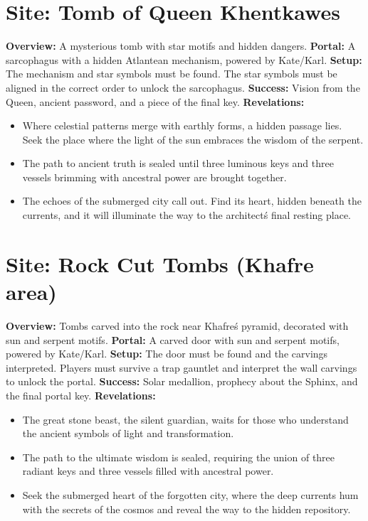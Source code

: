 \documentclass[12pt]{article}
\begin{document}
\hrulefill

\section*{Site: Tomb of Queen Khentkawes}
\textbf{Overview:}
A mysterious tomb with star motifs and hidden dangers.
\textbf{Portal:}
A sarcophagus with a hidden Atlantean mechanism, powered by Kate/Karl.
\textbf{Setup:}
The mechanism and star symbols must be found. The star symbols must be aligned in the correct order to unlock the sarcophagus.
\textbf{Success:}
Vision from the Queen, ancient password, and a piece of the final key.
\textbf{Revelations:}
\begin{itemize}
  \item Where celestial patterns merge with earthly forms, a hidden passage lies. Seek the place where the light of the sun embraces the wisdom of the serpent.
  \item The path to ancient truth is sealed until three luminous keys and three vessels brimming with ancestral power are brought together.
  \item The echoes of the submerged city call out. Find its heart, hidden beneath the currents, and it will illuminate the way to the architect\'s final resting place.
\end{itemize}

\hrulefill

\section*{Site: Rock Cut Tombs (Khafre area)}
\textbf{Overview:}
Tombs carved into the rock near Khafre\'s pyramid, decorated with sun and serpent motifs.
\textbf{Portal:}
A carved door with sun and serpent motifs, powered by Kate/Karl.
\textbf{Setup:}
The door must be found and the carvings interpreted. Players must survive a trap gauntlet and interpret the wall carvings to unlock the portal.
\textbf{Success:}
Solar medallion, prophecy about the Sphinx, and the final portal key.
\textbf{Revelations:}
\begin{itemize}
  \item The great stone beast, the silent guardian, waits for those who understand the ancient symbols of light and transformation.
  \item The path to the ultimate wisdom is sealed, requiring the union of three radiant keys and three vessels filled with ancestral power.
  \item Seek the submerged heart of the forgotten city, where the deep currents hum with the secrets of the cosmos and reveal the way to the hidden repository.
\end{itemize}
\end{document}
